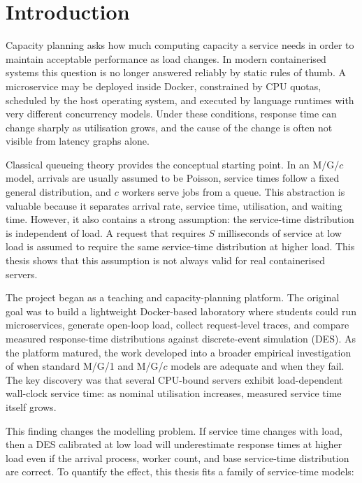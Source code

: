 \chapter{Introduction}
\label{ch:intro}

Capacity planning asks how much computing capacity a service needs in order to maintain acceptable performance as load changes. In modern containerised systems this question is no longer answered reliably by static rules of thumb. A microservice may be deployed inside Docker, constrained by CPU quotas, scheduled by the host operating system, and executed by language runtimes with very different concurrency models. Under these conditions, response time can change sharply as utilisation grows, and the cause of the change is often not visible from latency graphs alone.

Classical queueing theory provides the conceptual starting point. In an M/G/$c$ model, arrivals are usually assumed to be Poisson, service times follow a fixed general distribution, and $c$ workers serve jobs from a queue. This abstraction is valuable because it separates arrival rate, service time, utilisation, and waiting time. However, it also contains a strong assumption: the service-time distribution is independent of load. A request that requires $S$ milliseconds of service at low load is assumed to require the same service-time distribution at higher load. This thesis shows that this assumption is not always valid for real containerised servers.

The project began as a teaching and capacity-planning platform. The original goal was to build a lightweight Docker-based laboratory where students could run microservices, generate open-loop load, collect request-level traces, and compare measured response-time distributions against discrete-event simulation (DES). As the platform matured, the work developed into a broader empirical investigation of when standard M/G/1 and M/G/$c$ models are adequate and when they fail. The key discovery was that several CPU-bound servers exhibit load-dependent wall-clock service time: as nominal utilisation increases, measured service time itself grows.

This finding changes the modelling problem. If service time changes with load, then a DES calibrated at low load will underestimate response times at higher load even if the arrival process, worker count, and base service-time distribution are correct. To quantify the effect, this thesis fits a family of service-time models:

